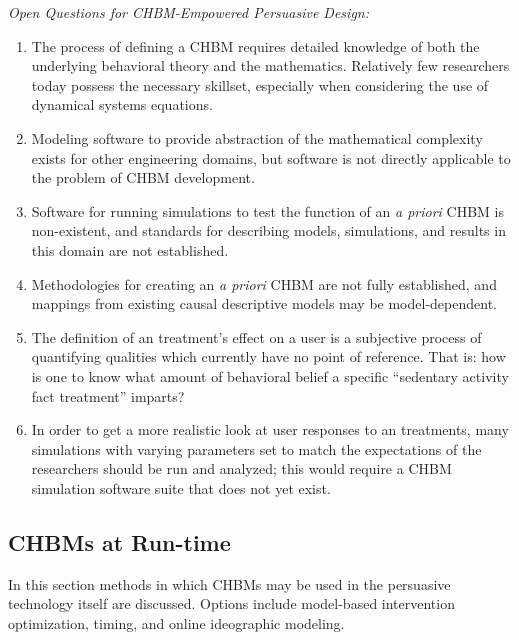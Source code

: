 \documentclass[runningheads,a4paper]{llncs}
\begin{document}
\emph{Open Questions for CHBM-Empowered Persuasive Design:}
\begin{enumerate}
    \item The process of defining a CHBM requires detailed knowledge of both the underlying behavioral theory and the mathematics. Relatively few researchers today possess the necessary skillset, especially when considering the use of dynamical systems equations.
    \item Modeling software to provide abstraction of the mathematical complexity exists for other engineering domains, but software is not directly applicable to the problem of CHBM development. %
    \item Software for running simulations to test the function of an \emph{a priori} CHBM is non-existent, and standards for describing models, simulations, and results in this domain are not established.
    \item Methodologies for creating an \emph{a priori} CHBM are not fully established, and mappings from existing causal descriptive models may be model-dependent.
    \item The definition of an treatment's effect on a user is a subjective process of quantifying qualities which currently have no point of reference.
That is: how is one to know what amount of behavioral belief a specific ``sedentary activity fact treatment'' imparts?
  \item %
In order to get a more realistic look at user responses to an treatments, many simulations with varying parameters set to match the expectations of the researchers should be run and analyzed; this would require a CHBM simulation software suite that does not yet exist.
\end{enumerate}


\subsection{CHBMs at Run-time}
In this section methods in which CHBMs may be used in the persuasive technology itself are discussed. 
Options include model-based intervention optimization, timing, and online ideographic modeling.
\end{document}
